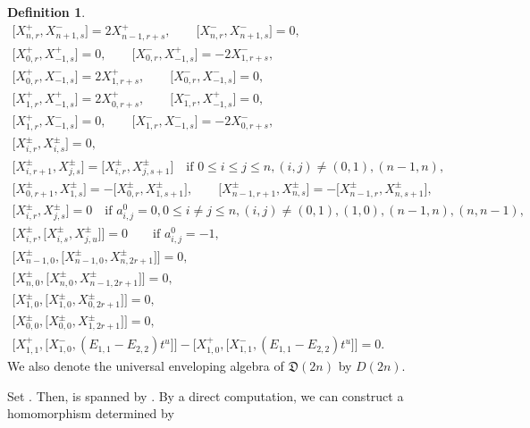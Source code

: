 \documentclass[pdftex]{sigma}
\numberwithin{equation}{section}
\theoremstyle{definition}
\newtheorem{Definition}[Theorem]{Definition}
\begin{document}
\begin{Definition}
\begin{gather}
\bigl[X^+_{n,r},X^-_{n+1,s}\bigr]=2X^+_{n-1,r+s},\qquad \bigl[X^-_{n,r},X^-_{n+1,s}\bigr]=0, \label{5121}\\
\bigl[X^+_{0,r},X^+_{-1,s}\bigr]=0,\qquad \bigl[X^-_{0,r},X^+_{-1,s}\bigr]=-2X^-_{1,r+s}, \label{5122}\\
\bigl[X^+_{0,r},X^-_{-1,s}\bigr]=2X^+_{1,r+s},\qquad \bigl[X^-_{0,r},X^-_{-1,s}\bigr]=0, \label{5123}\\
\bigl[X^+_{1,r},X^+_{-1,s}\bigr]=2X^+_{0,r+s},\qquad \bigl[X^-_{1,r},X^+_{-1,s}\bigr]=0, \label{5124}\\
\bigl[X^+_{1,r},X^-_{-1,s}\bigr]=0,\qquad \bigl[X^-_{1,r},X^-_{-1,s}\bigr]=-2X^-_{0,r+s}, \label{5125}\\
\bigl[X^\pm_{i,r},X^\pm_{i,s}\bigr]=0, \label{5126}\\
\bigl[X^\pm_{i,r+1},X^\pm_{j,s}\bigr]=\bigl[X^\pm_{i,r},X^\pm_{j,s+1}\bigr]\quad \text{if }0\leq i\leq j\leq n,(i,j)\neq(0,1),(n-1,n),\label{5127}\\
\bigl[X^\pm_{0,r+1},X^\pm_{1,s}\bigr]=-\bigl[X^\pm_{0,r},X^\pm_{1,s+1}\bigr],\qquad \bigl[X^\pm_{n-1,r+1},X^\pm_{n,s}\bigr]=-\bigl[X^\pm_{n-1,r},X^\pm_{n,s+1}\bigr], \label{5128}\\
\bigl[X^\pm_{i,r},X^\pm_{j,s}\bigr]=0\quad \text{if }a^0_{i,j}=0,0\leq i\neq j\leq n,(i,j)\neq(0,1),(1,0),(n-1,n),(n,n-1),\!\!\!\label{5129}\\
\bigl[X^\pm_{i,r},\bigl[X^\pm_{i,s},X^\pm_{j,u}\bigr]\bigr]=0\qquad \text{if }a^0_{i,j}=-1,\label{5130}\\
\bigl[X^\pm_{n-1,0},\bigl[X^\pm_{n-1,0},X^\pm_{n,2r+1}\bigr]\bigr]=0,\label{5131}\\
\bigl[X^\pm_{n,0},\bigl[X^\pm_{n,0},X^\pm_{n-1,2r+1}\bigr]\bigr]=0,\label{5132}\\
\bigl[X^\pm_{1,0},\bigl[X^\pm_{1,0},X^\pm_{0,2r+1}\bigr]\bigr]=0,\label{5133}\\
\bigl[X^\pm_{0,0},\bigl[X^\pm_{0,0},X^\pm_{1,2r+1}\bigr]\bigr]=0,\label{5134}\\
\bigl[X^+_{1,1},\bigl[X^-_{1,0},(E_{1,1}-E_{2,2})t^u\bigr]\bigr]-\bigl[X^+_{1,0}, \bigl[X^-_{1,1},(E_{1,1}-E_{2,2})t^u\bigr]\bigr]=0. \label{5135}
\end{gather}
We also denote the universal enveloping algebra of $\mathfrak{D}(2n)$ by $D(2n)$.
\end{Definition}
Set . Then,  is spanned by . By a direct computation, we can construct a homomorphism  determined by
\end{document}
